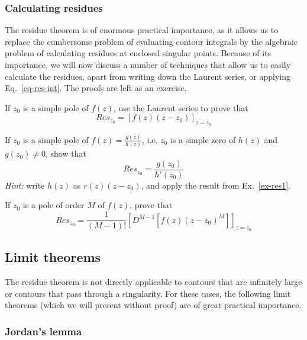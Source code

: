 \subsubsection*{Calculating residues}

The residue theorem is of enormous practical importance, as it allows us to
replace the cumbersome problem of evaluating contour integrals by the algebraic
problem of calculating residues at enclosed singular points. Because of its
importance, we will now discuss a number of techniques that allow us to easily
calculate the residues, apart from writing down the Laurent series, or applying
Eq.~\ref{eq-res-int}. The proofs are left as an exercise.

\begin{sidebar}
\begin{ex}
If $z_0$ is a simple pole of $f(z)$, use the Laurent series to prove that
$$Res_{z_0} = \left[f(z)(z-z_0)\right]_{z=z_0}$$ \label{ex-res1}
\end{ex}
\end{sidebar}

\begin{sidebar}
\begin{ex}
If $z_0$ is a simple pole of $f(z)=\frac{g(z)}{h(z)}$, i.e. $z_0$ is a simple zero of $h(z)$ and $g(z_0) \ne 0$, show that
$$Res_{z_0} = \frac{g(z_0)}{h'(z_0)}$$
\emph{Hint:} write $h(z)$ as $r(z)(z-z_0)$, and apply the result from Ex.~\ref{ex-res1}.
\end{ex}
\end{sidebar}

\begin{sidebar}
\begin{ex}
If $z_0$ is a pole of order $M$ of $f(z)$, prove that
$$Res_{z_0} = \frac{1}{(M-1)!}{\left[D^{M-1}[f(z)(z-z_0)^M]\right]}_{z=z_0}$$
\end{ex}
\end{sidebar}


\subsection{Limit theorems}

The residue theorem is not directly applicable to contours that are infinitely
large or contours that pass through a singularity. For these cases, the
following limit theorems (which we will present without proof) are of great
practical importance.

\subsubsection{Jordan's lemma}


